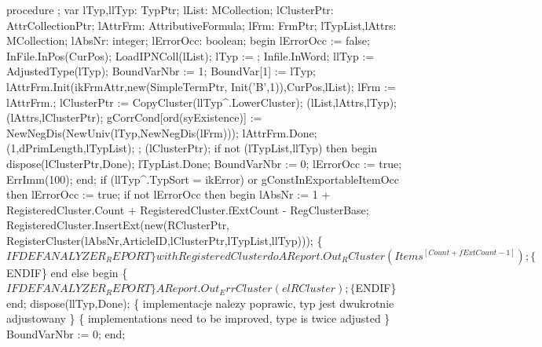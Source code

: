 procedure ;
var
   lTyp,llTyp: TypPtr;
   lList: MCollection;
   lClusterPtr: AttrCollectionPtr;
   lAttrFrm: AttributiveFormula;
   lFrm: FrmPtr;
   lTypList,lAttrs: MCollection;
   lAbsNr: integer;
   lErrorOcc: boolean;
begin
   lErrorOcc := false;
   InFile.InPos(CurPos);
   LoadIPNColl(lList);
   lTyp := ;
   Infile.InWord;
   llTyp := AdjustedType(lTyp);
   BoundVarNbr := 1;
   BoundVar[1] := lTyp;
   lAttrFrm.Init(ikFrmAttr,new(SimpleTermPtr, Init('B',1)),CurPos,lList);
   lFrm := lAttrFrm.;
   lClusterPtr := CopyCluster(llTyp^.LowerCluster);
   (lList,lAttrs,lTyp);
   (lAttrs,lClusterPtr);
   gCorrCond[ord(syExistence)] := NewNegDis(NewUniv(lTyp,NewNegDis(lFrm)));
   lAttrFrm.Done;
   (1,dPrimLength,lTypList);
   ;
   (lClusterPtr);
   if not (lTypList,llTyp) then
   begin
      dispose(lClusterPtr,Done);
      lTypList.Done;
      BoundVarNbr := 0;
      lErrorOcc := true;
      ErrImm(100);
   end;
   if (llTyp^.TypSort = ikError) or gConstInExportableItemOcc then lErrorOcc := true;
   if not lErrorOcc then
   begin
      lAbsNr :=  1 + RegisteredCluster.Count +  RegisteredCluster.fExtCount - RegClusterBase;
      RegisteredCluster.InsertExt(new(RClusterPtr,
                                      RegisterCluster(lAbsNr,ArticleID,lClusterPtr,lTypList,llTyp)));
      \{$IFDEF ANALYZER_REPORT\}
      with RegisteredCluster do
         AReport.Out_RCluster(Items^[Count+fExtCount-1]);
      \{$ENDIF\}
   end
   else
   begin
      \{$IFDEF ANALYZER_REPORT\}
      AReport.Out_ErrCluster(elRCluster);
      \{$ENDIF\}
   end;
   dispose(llTyp,Done);
   \{ implementacje nalezy poprawic, typ jest dwukrotnie
     adjustowany
   \}
   \{ implementations need to be improved, type is twice
      adjusted
    \}
   BoundVarNbr := 0;
end;
\eatline
